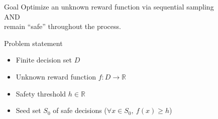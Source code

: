 \documentclass[xetex,10pt,mathserif]{beamer}
\newlength\figureheight
\newlength\figurewidth
\begin{document}

\begin{frame}{Goal}
\centering
\large
Optimize an unknown reward function via sequential sampling\\[1em]
AND\\[1em]
remain ``safe'' throughout the process.
\end{frame}

\begin{frame}{Problem statement}
\begin{itemize}
\item<1-> Finite decision set $D$
\vspace{0.5em}
\item<1-> Unknown reward function $f : D \to \mathbb{R}$
\vspace{0.5em}
\item<2-> Safety threshold $h \in \mathbb{R}$
\vspace{0.5em}
\item<4-> Seed set $S_0$ of safe decisions ($\forall x \in S_0,\ f(x) \geq h$)
\end{itemize}




\end{frame}
\end{document}
